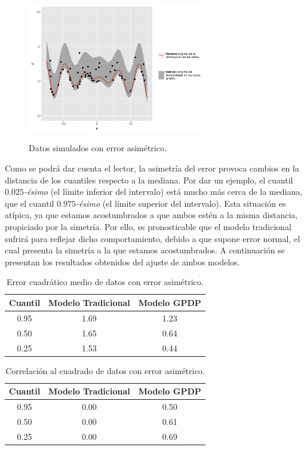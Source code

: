 \begin{figure}[H]
	\centering
	\caption{Datos simulados con error asim\'etrico.}
	\includegraphics[width=0.7\textwidth]{Figures/Simulation/asymmetric/sample.png}
	\label{sample_asymmetric}
\end{figure}

Como se podr\'a dar cuenta el lector, la asimetr\'ia del error provoca cambios en la distancia de los cuantiles respecto a la mediana. Por dar un ejemplo, el cuantil $0.025$\textit{-\'esimo} (el l\'imite inferior del intervalo) est\'a mucho m\'as cerca de la mediana, que el cuantil $0.975$\textit{-\'esimo} (el l\'imite superior del intervalo). Esta situaci\'on es at\'ipica, ya que estamos acostumbrados a que ambos est\'en a la misma distancia, propiciado por la simetr\'ia. Por ello, es pronosticable que el modelo tradicional sufrir\'a para reflejar dicho comportamiento, debido a que supone error normal, el cual presenta la simetr\'ia a la que estamos acostumbrados. A continuaci\'on se presentan los resultados obtenidos del ajuste de ambos modelos.

\begin{table}[H]
\centering
\caption{Error cuadrático medio de datos con error asimétrico.}
\begin{tabular}{ccc}
  \hline
Cuantil & Modelo Tradicional & Modelo GPDP \\ 
  \hline
0.95 & 1.69 & 1.23 \\ 
  0.50 & 1.65 & 0.64 \\ 
  0.25 & 1.53 & 0.44 \\ 
   \hline
\end{tabular}
\label{mse_asymmetric}
\end{table}

\begin{table}[H]
\centering
\caption{Correlación al cuadrado de datos con error asimétrico.}
\begin{tabular}{ccc}
  \hline
Cuantil & Modelo Tradicional & Modelo GPDP \\ 
  \hline
0.95 & 0.00 & 0.50 \\ 
  0.50 & 0.00 & 0.61 \\ 
  0.25 & 0.00 & 0.69 \\ 
   \hline
\end{tabular}
\label{corr_asymmetric}
\end{table}

